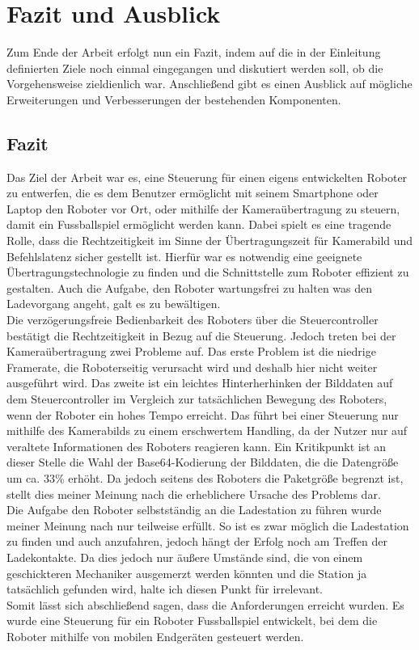 \chapter{Fazit und Ausblick}
\label{ch:fazit}

Zum Ende der Arbeit erfolgt nun ein Fazit, indem auf die in der Einleitung definierten Ziele noch einmal eingegangen und diskutiert werden soll, ob die Vorgehensweise zieldienlich war. Anschließend gibt es einen Ausblick auf mögliche Erweiterungen und Verbesserungen der bestehenden Komponenten.

\section{Fazit}
Das Ziel der Arbeit war es, eine Steuerung für einen eigens entwickelten Roboter zu entwerfen, die es dem Benutzer ermöglicht mit seinem Smartphone oder Laptop den Roboter vor Ort, oder mithilfe der Kameraübertragung zu steuern, damit ein Fussballspiel ermöglicht werden kann. Dabei spielt es eine tragende Rolle, dass die Rechtzeitigkeit im Sinne der Übertragungszeit für Kamerabild und Befehlslatenz sicher gestellt ist. Hierfür war es notwendig eine geeignete Übertragungstechnologie zu finden und die Schnittstelle zum Roboter effizient zu gestalten. Auch die Aufgabe, den Roboter wartungsfrei zu halten was den Ladevorgang angeht, galt es zu bewältigen. \\
Die verzögerungsfreie Bedienbarkeit des Roboters über die Steuercontroller bestätigt die Rechtzeitigkeit in Bezug auf die Steuerung. Jedoch treten bei der Kameraübertragung zwei Probleme auf. Das erste Problem ist die niedrige Framerate, die Roboterseitig verursacht wird und deshalb hier nicht weiter ausgeführt wird. Das zweite ist ein leichtes Hinterherhinken der Bilddaten auf dem Steuercontroller im Vergleich zur tatsächlichen Bewegung des Roboters, wenn der Roboter ein hohes Tempo erreicht. Das führt bei einer Steuerung nur mithilfe des Kamerabilds zu einem erschwertem Handling, da der Nutzer nur auf veraltete Informationen des Roboters reagieren kann. Ein Kritikpunkt ist an dieser Stelle die Wahl der Base64-Kodierung der Bilddaten, die die Datengröße um ca. 33\% erhöht. Da jedoch seitens des Roboters die Paketgröße begrenzt ist, stellt dies meiner Meinung nach die erheblichere Ursache des Problems dar. \\
Die Aufgabe den Roboter selbstständig an die Ladestation zu führen wurde meiner Meinung nach nur teilweise erfüllt. So ist es zwar möglich die Ladestation zu finden und auch anzufahren, jedoch hängt der Erfolg noch am Treffen der Ladekontakte. Da dies jedoch nur äußere Umstände sind, die von einem geschickteren Mechaniker ausgemerzt werden könnten und die Station ja tatsächlich gefunden wird, halte ich diesen Punkt für irrelevant. \\
Somit lässt sich abschließend sagen, dass die Anforderungen erreicht wurden. Es wurde eine Steuerung für ein Roboter Fussballspiel entwickelt, bei dem die Roboter mithilfe von mobilen Endgeräten gesteuert werden.





